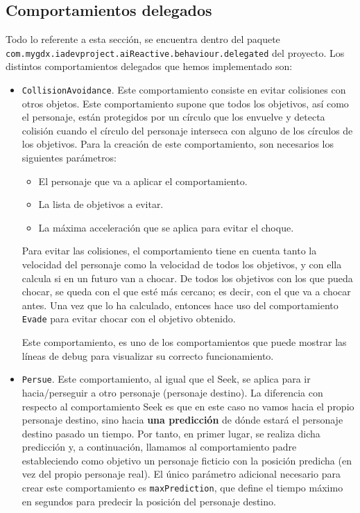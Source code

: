 \subsection{Comportamientos delegados}
Todo lo referente a esta sección, se encuentra dentro del paquete \\ \texttt{com.mygdx.iadevproject.aiReactive.behaviour.delegated} del proyecto. Los distintos comportamientos delegados que hemos implementado son:
\begin{itemize}
 \item \texttt{CollisionAvoidance}. Este comportamiento consiste en evitar colisiones con otros objetos. Este comportamiento supone que todos los objetivos, así como el personaje, están protegidos por un círculo que los envuelve y detecta colisión cuando el círculo del personaje interseca con alguno de los círculos de los objetivos. Para la creación de este comportamiento, son necesarios los siguientes parámetros:
 \begin{itemize}
  \item El personaje que va a aplicar el comportamiento.
  \item La lista de objetivos a evitar.
  \item La máxima acceleración que se aplica para evitar el choque.
 \end{itemize}
 Para evitar las colisiones, el comportamiento tiene en cuenta tanto la velocidad del personaje como la velocidad de todos los objetivos, y con ella calcula si en un futuro van a chocar. De todos los objetivos con los que pueda chocar, se queda con el que esté más cercano; es decir, con el que va a chocar antes. Una vez que lo ha calculado, entonces hace uso del comportamiento \texttt{Evade} para evitar chocar con el objetivo obtenido. 
 
 Este comportamiento, es uno de los comportamientos que puede mostrar las líneas de debug para visualizar su correcto funcionamiento. 
 
 \item \texttt{Persue}. Este comportamiento, al igual que el Seek, se aplica para ir hacia/perseguir a otro personaje (personaje destino). La diferencia con respecto al comportamiento Seek es que en este caso no vamos hacia el propio personaje destino, sino hacia \textbf{una predicción} de dónde estará el personaje destino pasado un tiempo. Por tanto, en primer lugar, se realiza dicha predicción y, a continuación, llamamos al comportamiento padre estableciendo como objetivo un personaje ficticio con la posición predicha (en vez del propio personaje real). El único parámetro adicional necesario para crear este comportamiento es \texttt{maxPrediction}, que define el tiempo máximo en segundos para predecir la posición del personaje destino.
  

\end{itemize}
